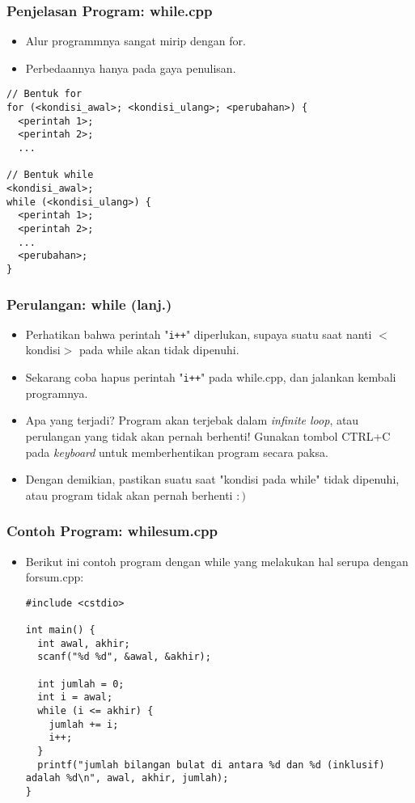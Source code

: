 \begin{frame}[fragile]
\frametitle{Penjelasan Program: while.cpp}
\begin{itemize}
  \item Alur programmnya sangat mirip dengan for.
  \item Perbedaannya hanya pada gaya penulisan.
\end{itemize}
\begin{lstlisting}
// Bentuk for
for (<kondisi_awal>; <kondisi_ulang>; <perubahan>) {
  <perintah 1>;
  <perintah 2>;
  ...

// Bentuk while
<kondisi_awal>;
while (<kondisi_ulang>) {
  <perintah 1>;
  <perintah 2>;
  ...
  <perubahan>;
}
\end{lstlisting}

\end{frame}

\begin{frame}
\frametitle{Perulangan: while (lanj.)}
\begin{itemize}
  \item Perhatikan bahwa perintah "\texttt{i++}" diperlukan, supaya suatu saat nanti $<$kondisi$>$ pada while akan tidak dipenuhi.
  \item Sekarang coba hapus perintah "\texttt{i++}" pada while.cpp, dan jalankan kembali programnya.
  \item Apa yang terjadi? Program akan terjebak dalam \alert{\textit{infinite loop}}, atau \alert{perulangan yang tidak akan pernah berhenti}! Gunakan tombol CTRL+C pada \textit{keyboard} untuk memberhentikan program secara paksa.
  \item Dengan demikian, pastikan suatu saat "kondisi pada while" tidak dipenuhi, atau program tidak akan pernah berhenti $:)$
\end{itemize}
\end{frame}

\begin{frame}[fragile]
\frametitle{Contoh Program: whilesum.cpp}
\begin{itemize}
  \item Berikut ini contoh program dengan while yang melakukan hal serupa dengan forsum.cpp:
\begin{lstlisting}
#include <cstdio>

int main() {
  int awal, akhir;
  scanf("%d %d", &awal, &akhir);

  int jumlah = 0;
  int i = awal;
  while (i <= akhir) {
    jumlah += i;
    i++;
  }
  printf("jumlah bilangan bulat di antara %d dan %d (inklusif) adalah %d\n", awal, akhir, jumlah);
}
\end{lstlisting}
\end{itemize}
\end{frame}

